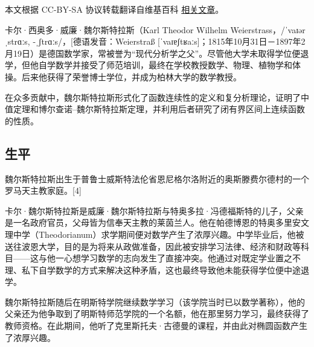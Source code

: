 
本文根据 CC-BY-SA 协议转载翻译自维基百科 \href{https://en.wikipedia.org/wiki/Karl_Weierstrass}{相关文章}。

卡尔·西奥多·威廉·魏尔斯特拉斯（Karl Theodor Wilhelm Weierstrass，/ˈvaɪərˌstrɑːs, -ˌʃtrɑːs/，[德语发音：Weierstraß [ˈvaɪɐʃtʁaːs]；1815年10月31日－1897年2月19日）是德国数学家，常被誉为“现代分析学之父”。尽管他大学未取得学位便退学，但他自学数学并接受了师范培训，最终在学校教授数学、物理、植物学和体操。后来他获得了荣誉博士学位，并成为柏林大学的数学教授。

在众多贡献中，魏尔斯特拉斯形式化了函数连续性的定义和复分析理论，证明了中值定理和博尔查诺–魏尔斯特拉斯定理，并利用后者研究了闭有界区间上连续函数的性质。
\subsection{生平}
魏尔斯特拉斯出生于普鲁士威斯特法伦省恩尼格尔洛附近的奥斯滕费尔德村的一个罗马天主教家庭。[4]

卡尔·魏尔斯特拉斯是威廉·魏尔斯特拉斯与特奥多拉·冯德福斯特的儿子，父亲是一名政府官员，父母皆为信奉天主教的莱茵兰人。他在帕德博恩的特奥多里安文理中学（Theodorianum）求学期间便对数学产生了浓厚兴趣。中学毕业后，他被送往波恩大学，目的是为将来从政做准备，因此被安排学习法律、经济和财政等科目——这与他一心想学习数学的志向发生了直接冲突。他通过对既定学业置之不理、私下自学数学的方式来解决这种矛盾，这也最终导致他未能获得学位便中途退学。

魏尔斯特拉斯随后在明斯特学院继续数学学习（该学院当时已以数学著称），他的父亲还为他争取到了明斯特师范学院的一个名额，他在那里努力学习，最终获得了教师资格。在此期间，他听了克里斯托夫·古德曼的课程，并由此对椭圆函数产生了浓厚兴趣。
